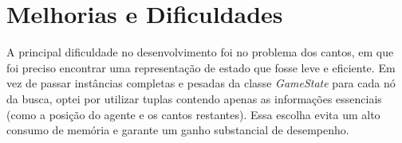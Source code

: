 \documentclass[a4paper,11pt]{article}
\begin{document}
\section{Melhorias e Dificuldades}

A principal dificuldade no desenvolvimento foi no problema dos cantos, em que foi preciso encontrar uma representação de estado que fosse leve e eficiente. Em vez de passar instâncias completas e pesadas da classe \textit{GameState} para cada nó da busca, optei por utilizar tuplas contendo apenas as informações essenciais (como a posição do agente e os cantos restantes). Essa escolha evita um alto consumo de memória e garante um ganho substancial de desempenho.
\end{document}

